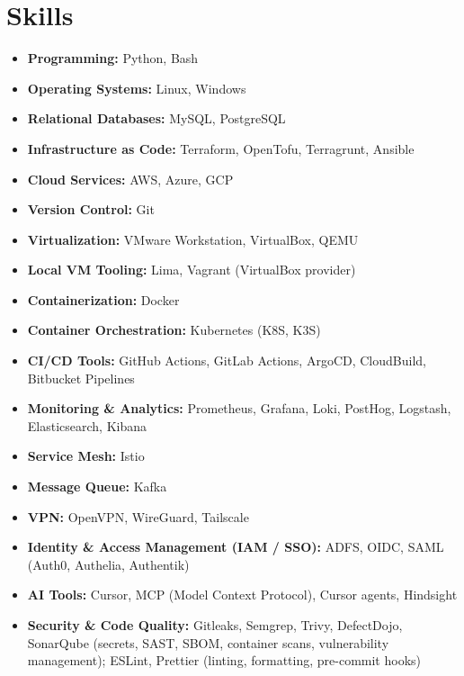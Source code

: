 \documentclass[a4paper,10pt]{article}
\begin{document}
\section*{Skills}
\begin{itemize}[leftmargin=0.5in]
    \item \textbf{Programming:} Python, Bash
    \item \textbf{Operating Systems:} Linux, Windows
    \item \textbf{Relational Databases:} MySQL, PostgreSQL
    \item \textbf{Infrastructure as Code:} Terraform, OpenTofu, Terragrunt, Ansible
    \item \textbf{Cloud Services:} AWS, Azure, GCP
    \item \textbf{Version Control:} Git
    \item \textbf{Virtualization:} VMware Workstation, VirtualBox, QEMU
    \item \textbf{Local VM Tooling:} Lima, Vagrant (VirtualBox provider)
    \item \textbf{Containerization:} Docker
    \item \textbf{Container Orchestration:} Kubernetes (K8S, K3S)
    \item \textbf{CI/CD Tools:} GitHub Actions, GitLab Actions, ArgoCD, CloudBuild, Bitbucket Pipelines
    \item \textbf{Monitoring \& Analytics:} Prometheus, Grafana, Loki, PostHog, Logstash, Elasticsearch, Kibana
    \item \textbf{Service Mesh:} Istio
    \item \textbf{Message Queue:} Kafka
    \item \textbf{VPN:} OpenVPN, WireGuard, Tailscale
    \item \textbf{Identity \& Access Management (IAM / SSO):} ADFS, OIDC, SAML (Auth0, Authelia, Authentik)
    \item \textbf{AI Tools:} Cursor, MCP (Model Context Protocol), Cursor agents, Hindsight
    \item \textbf{Security \& Code Quality:} Gitleaks, Semgrep, Trivy, DefectDojo, SonarQube (secrets, SAST, SBOM, container scans, vulnerability management); ESLint, Prettier (linting, formatting, pre-commit hooks)
\end{itemize}
\end{document}
